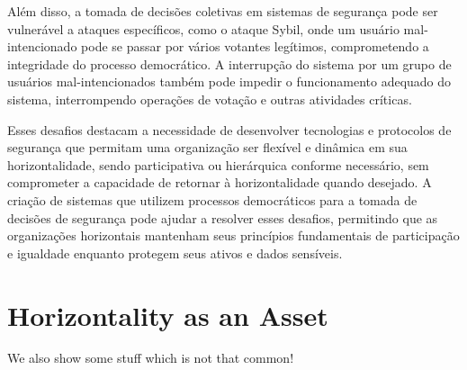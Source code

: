 Além disso, a tomada de decisões coletivas em sistemas de segurança pode ser
vulnerável a ataques específicos, como o ataque Sybil, onde um usuário mal-intencionado
pode se passar por vários votantes legítimos, comprometendo a integridade do
processo democrático. A interrupção do sistema por um grupo de usuários
mal-intencionados também pode impedir o funcionamento adequado do sistema, interrompendo
operações de votação e outras atividades críticas. 

Esses desafios destacam a necessidade de desenvolver tecnologias e protocolos
de segurança que permitam uma organização ser flexível e dinâmica em sua
horizontalidade, sendo participativa ou hierárquica conforme necessário, sem comprometer a
capacidade de retornar à horizontalidade quando desejado. A criação de sistemas que
utilizem processos democráticos para a tomada de decisões de segurança pode ajudar a
resolver esses desafios, permitindo que as organizações horizontais mantenham seus
princípios fundamentais de participação e igualdade enquanto protegem seus ativos e dados
sensíveis. 

\section{Horizontality as an Asset}
\label{sec:horizontality_asset}

We also show some stuff which is not that common!
